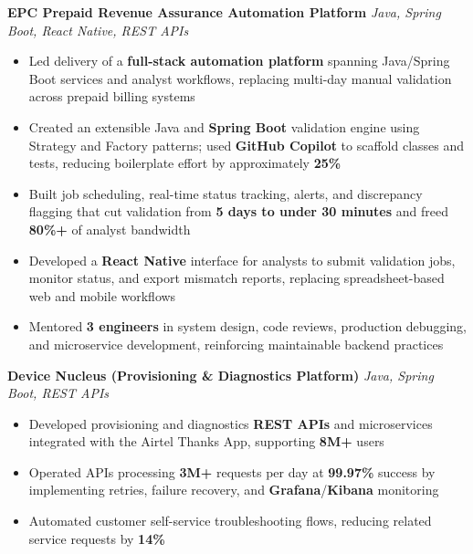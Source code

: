 \documentclass[letterpaper,11pt]{article}
\newcommand{\resumeItem}[1]{
  \item\small{{#1 \vspace{-2pt}}}
}
\newcommand{\resumeItemListStart}{\begin{itemize}}
\newcommand{\resumeItemListEnd}{\end{itemize}\vspace{-5pt}}
\begin{document}
      \vspace{4pt}
      \textbf{\small EPC Prepaid Revenue Assurance Automation Platform} \hfill \textit{\small Java, Spring Boot, React Native, REST APIs} \\
      \vspace{-2pt}
      \resumeItemListStart
        \resumeItem{Led delivery of a \textbf{full-stack automation platform} spanning Java/Spring Boot services and analyst workflows, replacing multi-day manual validation across prepaid billing systems}
        \resumeItem{Created an extensible Java and \textbf{Spring Boot} validation engine using Strategy and Factory patterns; used \textbf{GitHub Copilot} to scaffold classes and tests, reducing boilerplate effort by approximately \textbf{25\%}}
        \resumeItem{Built job scheduling, real-time status tracking, alerts, and discrepancy flagging that cut validation from \textbf{5 days to under 30 minutes} and freed \textbf{80\%+} of analyst bandwidth}
        \resumeItem{Developed a \textbf{React Native} interface for analysts to submit validation jobs, monitor status, and export mismatch reports, replacing spreadsheet-based web and mobile workflows}
        \resumeItem{Mentored \textbf{3 engineers} in system design, code reviews, production debugging, and microservice development, reinforcing maintainable backend practices}
      \resumeItemListEnd

      \vspace{4pt}
      \textbf{\small Device Nucleus (Provisioning \& Diagnostics Platform)} \hfill \textit{\small Java, Spring Boot, REST APIs} \\
      \vspace{-2pt}
      \resumeItemListStart
        \resumeItem{Developed provisioning and diagnostics \textbf{REST APIs} and microservices integrated with the Airtel Thanks App, supporting \textbf{8M+} users}
        \resumeItem{Operated APIs processing \textbf{3M+} requests per day at \textbf{99.97\%} success by implementing retries, failure recovery, and \textbf{Grafana}/\textbf{Kibana} monitoring}
        \resumeItem{Automated customer self-service troubleshooting flows, reducing related service requests by \textbf{14\%}}
      \resumeItemListEnd
\end{document}
